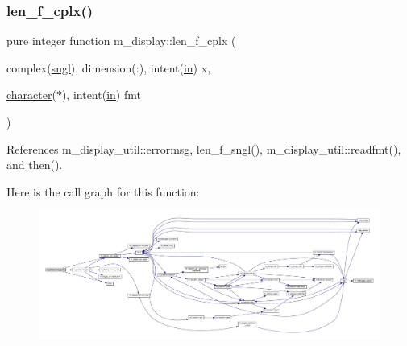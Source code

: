 \subsubsection{\texorpdfstring{len\+\_\+f\+\_\+cplx()}{len\_f\_cplx()}}
{\footnotesize\ttfamily pure integer function m\+\_\+display\+::len\+\_\+f\+\_\+cplx (\begin{DoxyParamCaption}\item[{complex(\hyperlink{namespacem__display_a2ac86bc535c3ccc5947dbb3109c666b5}{sngl}), dimension(\+:), intent(\hyperlink{M__journal_83_8txt_afce72651d1eed785a2132bee863b2f38}{in})}]{x,  }\item[{\hyperlink{option__stopwatch_83_8txt_abd4b21fbbd175834027b5224bfe97e66}{character}($\ast$), intent(\hyperlink{M__journal_83_8txt_afce72651d1eed785a2132bee863b2f38}{in})}]{fmt }\end{DoxyParamCaption})\hspace{0.3cm}{\ttfamily [private]}}



References m\+\_\+display\+\_\+util\+::errormsg, len\+\_\+f\+\_\+sngl(), m\+\_\+display\+\_\+util\+::readfmt(), and then().

Here is the call graph for this function\+:
\nopagebreak
\begin{figure}[H]
\begin{center}
\leavevmode
\includegraphics[width=350pt]{namespacem__display_a37f268a7276f14d4975200a8f83acff3_cgraph}
\end{center}
\end{figure}
\mbox{\label{namespacem__display_aa013a639d5b0f7e40b627c9d712693f0}} 
